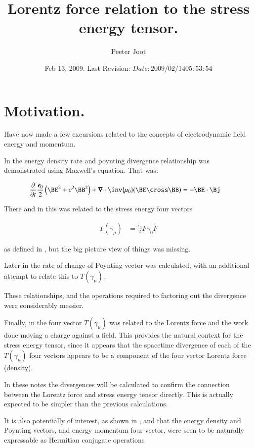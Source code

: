 \documentclass{article}
\title{ Lorentz force relation to the stress energy tensor. }
\author{Peeter Joot}
\date{ Feb 13, 2009.  Last Revision: $Date: 2009/02/14 05:53:54 $ }
\begin{document}
\maketitle{}

\tableofcontents

\section{ Motivation. }

Have now made a few excursions related to the concepts of electrodynamic
field energy and momentum.

In \cite{PJpoynting} the energy density rate and poynting divergence 
relationship was demonstrated using Maxwell's equation.  That was:

\begin{align}
\PD{t}{}\frac{\epsilon_0}{2} \left(\BE^2 + c^2 \BB^2\right) + \spacegrad \cdot \inv{\mu_0}(\BE \cross \BB) &= -\BE \cdot \Bj 
\end{align}

There and in \cite{PJemstresstensor} this was related to the 
stress energy four vectors

\begin{align}
T(\gamma_\mu) &= \frac{\epsilon_0}{2} F \gamma_0 \tilde{F}
\end{align}

as defined
in \cite{doran2003gap}, but the big picture view 
of things was missing.

Later in \cite{PJpoyntingRate} the rate of change of Poynting vector
was calculated, with an additional attempt to relate this to $T(\gamma_\mu)$.

These relationships, and the operations required to factoring out the divergence were considerably messier.

Finally, in \cite{PJelectricFieldEnergy} the four vector $T(\gamma_\mu)$
was related to the Lorentz force and the work done moving a charge against
a field.  This provides the natural context for the stress energy tensor, 
since it appears that the spacetime divergence of each of the
$T(\gamma_\mu)$ four vectors appears to be a component of the
four vector Lorentz force (density).  

In these notes the divergences will be calculated to confirm the
connection between the Lorentz force and stress energy tensor directly.
This is actually expected to be simpler than the previous calculations.

It is also 
potentially of interest, as shown in \cite{PJFourierVacuum}, and
\cite{PJplaneWave}
that the energy density and Poynting vectors, and energy momentum four vector,
were seen to be naturally expressable as Hermitian conjugate operations
\end{document}
